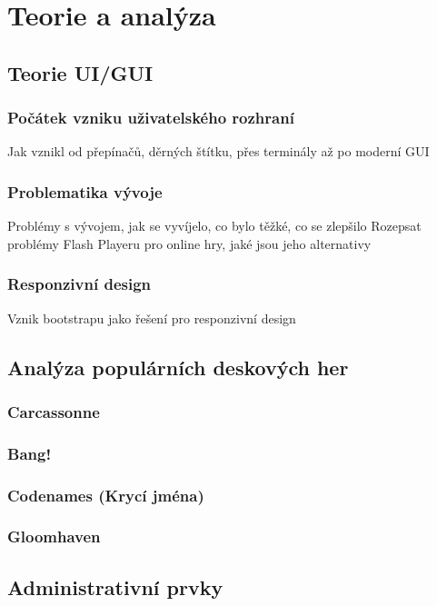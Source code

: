 \chapter{Teorie a analýza}
\label{ch:theory_and_analysis}

\section{Teorie UI/GUI}
\label{sec:ui-gui-theory}

\subsection{Počátek vzniku uživatelského rozhraní}
\label{subsec:ui-gui-theory-beginning}
Jak vznikl od přepínačů, děrných štítku, přes terminály až po moderní GUI

\subsection{Problematika vývoje}
\label{subsec:ui-gui-theory-problems}
Problémy s vývojem, jak se vyvíjelo, co bylo těžké, co se zlepšilo
Rozepsat problémy Flash Playeru pro online hry, jaké jsou jeho alternativy

\subsection{Responzivní design}
\label{subsec:ui-gui-theory-responsive-design}
Vznik bootstrapu jako řešení pro responzivní design

\section{Analýza populárních deskových her}
\label{sec:popular-board-games-analysis}

\subsection{Carcassonne}
\label{subsec:popular-board-games-analysis-carcassonne}

\subsection{Bang!}
\label{subsec:popular-board-games-analysis-bang}

\subsection{Codenames (Krycí jména)}
\label{subsec:popular-board-games-analysis-codenames}

\subsection{Gloomhaven}
\label{subsec:popular-board-games-analysis-gloomhaven}

\section{Administrativní prvky}
\label{sec:admin-elements}

\endinput
